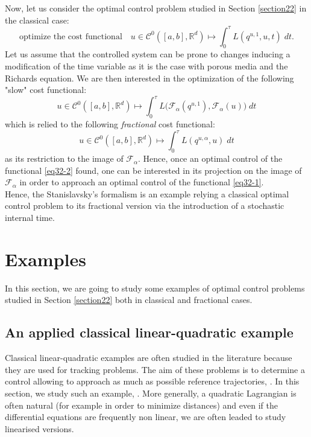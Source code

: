 \documentclass[english,11pt,reqno]{smfart}
\def\di{\displaystyle}
\newcommand{\R}{\mathbb{R}}
\newcommand{\CC}{\mathscr{C}}
\begin{document}
Now, let us consider the optimal control problem studied in Section \ref{section22} in the classical case: 
\begin{equation}
\text{optimize the cost functional} \quad u \in \CC^0 ([a,b],\R^d) \longmapsto \di \int_0^\tau L(q^{u,1},u,t) \; dt.
\end{equation}
Let us assume that the controlled system can be prone to changes inducing a modification of the time variable as it is the case with porous media and the Richards equation. We are then interested in the optimization of the following "slow" cost functional:
\begin{equation}\label{eq32-1}
u \in \CC^0 ([a,b],\R^d) \longmapsto \di \int_0^\tau L\big( \mathcal{F}_\alpha (q^{u,1}),\mathcal{F}_\alpha (u) \big) \; dt
\end{equation}
which is relied to the following \textit{fractional} cost functional:
\begin{equation}\label{eq32-2}
u \in \CC^0 ([a,b],\R^d) \longmapsto \di \int_0^\tau L ( q^{u,\alpha},u ) \; dt 
\end{equation}
as its restriction to the image of $\mathcal{F}_\alpha$. Hence, once an optimal control of the functional \eqref{eq32-2} found, one can be interested in its projection on the image of $\mathcal{F}_\alpha$ in order to approach an optimal control of the functional \eqref{eq32-1}. \\

Hence, the Stanislavsky's formalism is an example relying a classical optimal control problem to its fractional version via the introduction of a stochastic internal time.



\section{Examples}\label{section4} 
In this section, we are going to study some examples of optimal control problems studied in Section \ref{section22} both in classical and fractional cases.
\subsection{An applied classical linear-quadratic example}\label{section41}
Classical linear-quadratic examples are often studied in the literature because they are used for tracking problems. The aim of these problems is to determine a control allowing to approach as much as possible reference trajectories, \cite[Part 1.4, p.49]{trel}. In this section, we study such an example, \cite[Part 4.4.3, example 3, p.53]{evan}. More generally, a quadratic Lagrangian is often natural (for example in order to minimize distances) and even if the differential equations are frequently non linear, we are often leaded to study linearised versions. \\
\end{document}
